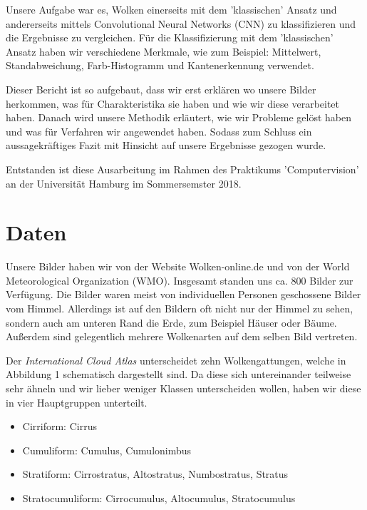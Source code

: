 \documentclass[a4,german]{article}
\begin{document}
Unsere Aufgabe war es, Wolken einerseits mit dem 'klassischen' Ansatz und andererseits mittels Convolutional Neural Networks (CNN) zu klassifizieren und die Ergebnisse zu vergleichen. 
Für die Klassifizierung mit dem 'klassischen' Ansatz haben wir verschiedene Merkmale, wie zum Beispiel: Mittelwert, Standabweichung, Farb-Histogramm und Kantenerkennung verwendet.
 
 Dieser Bericht ist so aufgebaut, dass wir erst erklären wo unsere Bilder herkommen, was für Charakteristika sie haben und wie wir diese verarbeitet haben. Danach wird unsere Methodik erläutert, wie wir Probleme gelöst haben und was für Verfahren wir angewendet haben. Sodass zum Schluss ein aussagekräftiges Fazit mit Hinsicht auf unsere Ergebnisse gezogen wurde.
 
Entstanden ist diese Ausarbeitung im Rahmen des Praktikums 'Computervision' an der Universität Hamburg im Sommersemster 2018.



\section{Daten}


Unsere Bilder haben wir von der Website Wolken-online.de und von der World Meteorological Organization (WMO).
Insgesamt standen uns ca. 800 Bilder zur Verfügung.
Die Bilder waren meist von individuellen Personen geschossene Bilder vom Himmel. 
Allerdings ist auf den Bildern oft nicht nur der Himmel zu sehen, sondern auch am unteren Rand die Erde, zum Beispiel Häuser oder Bäume. Außerdem sind gelegentlich mehrere Wolkenarten auf dem selben Bild vertreten.

Der \textit{International Cloud Atlas} unterscheidet zehn Wolkengattungen, welche in Abbildung 1 schematisch dargestellt sind. Da diese sich untereinander teilweise sehr ähneln und wir lieber weniger Klassen unterscheiden wollen, haben wir diese in vier Hauptgruppen unterteilt.
\begin{itemize}
\item Cirriform: Cirrus
\item Cumuliform: Cumulus, Cumulonimbus
\item Stratiform: Cirrostratus, Altostratus, Numbostratus, Stratus
\item Stratocumuliform: Cirrocumulus, Altocumulus, Stratocumulus
\end{itemize}
\end{document}
